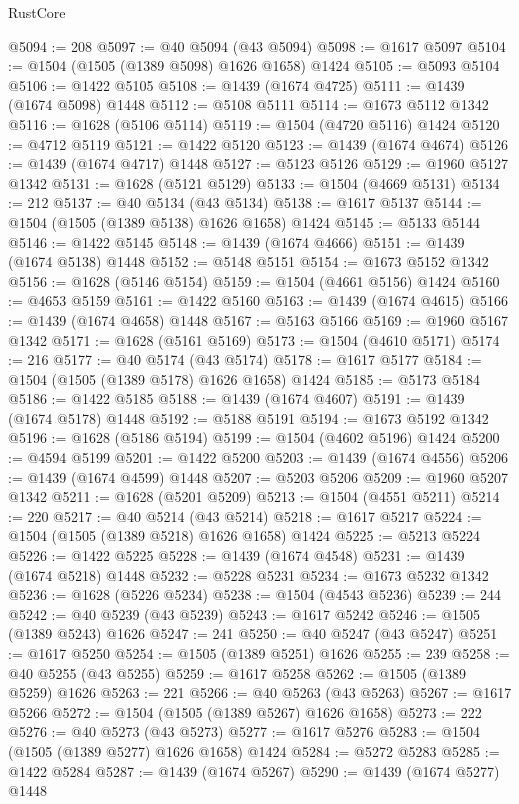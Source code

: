 \begin{lexlean}{RustCore}
\begin{coremodule}
@5094 := 208
@5097 := @40 @5094 (@43 @5094)
@5098 := @1617 @5097
@5104 := @1504 (@1505 (@1389 @5098) @1626 @1658) @1424
@5105 := @5093 @5104
@5106 := @1422 @5105
@5108 := @1439 (@1674 @4725)
@5111 := @1439 (@1674 @5098) @1448
@5112 := @5108 @5111
@5114 := @1673 @5112 @1342
@5116 := @1628 (@5106 @5114)
@5119 := @1504 (@4720 @5116) @1424
@5120 := @4712 @5119
@5121 := @1422 @5120
@5123 := @1439 (@1674 @4674)
@5126 := @1439 (@1674 @4717) @1448
@5127 := @5123 @5126
@5129 := @1960 @5127 @1342
@5131 := @1628 (@5121 @5129)
@5133 := @1504 (@4669 @5131)
@5134 := 212
@5137 := @40 @5134 (@43 @5134)
@5138 := @1617 @5137
@5144 := @1504 (@1505 (@1389 @5138) @1626 @1658) @1424
@5145 := @5133 @5144
@5146 := @1422 @5145
@5148 := @1439 (@1674 @4666)
@5151 := @1439 (@1674 @5138) @1448
@5152 := @5148 @5151
@5154 := @1673 @5152 @1342
@5156 := @1628 (@5146 @5154)
@5159 := @1504 (@4661 @5156) @1424
@5160 := @4653 @5159
@5161 := @1422 @5160
@5163 := @1439 (@1674 @4615)
@5166 := @1439 (@1674 @4658) @1448
@5167 := @5163 @5166
@5169 := @1960 @5167 @1342
@5171 := @1628 (@5161 @5169)
@5173 := @1504 (@4610 @5171)
@5174 := 216
@5177 := @40 @5174 (@43 @5174)
@5178 := @1617 @5177
@5184 := @1504 (@1505 (@1389 @5178) @1626 @1658) @1424
@5185 := @5173 @5184
@5186 := @1422 @5185
@5188 := @1439 (@1674 @4607)
@5191 := @1439 (@1674 @5178) @1448
@5192 := @5188 @5191
@5194 := @1673 @5192 @1342
@5196 := @1628 (@5186 @5194)
@5199 := @1504 (@4602 @5196) @1424
@5200 := @4594 @5199
@5201 := @1422 @5200
@5203 := @1439 (@1674 @4556)
@5206 := @1439 (@1674 @4599) @1448
@5207 := @5203 @5206
@5209 := @1960 @5207 @1342
@5211 := @1628 (@5201 @5209)
@5213 := @1504 (@4551 @5211)
@5214 := 220
@5217 := @40 @5214 (@43 @5214)
@5218 := @1617 @5217
@5224 := @1504 (@1505 (@1389 @5218) @1626 @1658) @1424
@5225 := @5213 @5224
@5226 := @1422 @5225
@5228 := @1439 (@1674 @4548)
@5231 := @1439 (@1674 @5218) @1448
@5232 := @5228 @5231
@5234 := @1673 @5232 @1342
@5236 := @1628 (@5226 @5234)
@5238 := @1504 (@4543 @5236)
@5239 := 244
@5242 := @40 @5239 (@43 @5239)
@5243 := @1617 @5242
@5246 := @1505 (@1389 @5243) @1626
@5247 := 241
@5250 := @40 @5247 (@43 @5247)
@5251 := @1617 @5250
@5254 := @1505 (@1389 @5251) @1626
@5255 := 239
@5258 := @40 @5255 (@43 @5255)
@5259 := @1617 @5258
@5262 := @1505 (@1389 @5259) @1626
@5263 := 221
@5266 := @40 @5263 (@43 @5263)
@5267 := @1617 @5266
@5272 := @1504 (@1505 (@1389 @5267) @1626 @1658)
@5273 := 222
@5276 := @40 @5273 (@43 @5273)
@5277 := @1617 @5276
@5283 := @1504 (@1505 (@1389 @5277) @1626 @1658) @1424
@5284 := @5272 @5283
@5285 := @1422 @5284
@5287 := @1439 (@1674 @5267)
@5290 := @1439 (@1674 @5277) @1448

\end{coremodule}
\end{lexlean}
